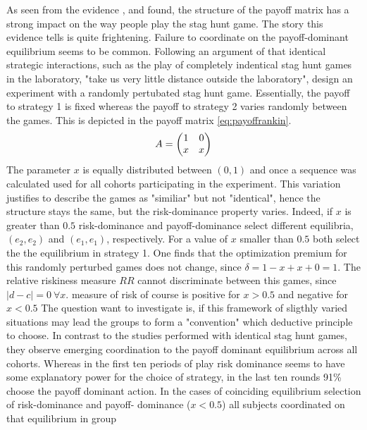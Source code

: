 \documentclass[11pt]{article}
\begin{document}
As seen from the evidence \textcite{battalio_optimization_2001},
\textcite{schmidt_playing_2003} and \textcite{dubois_optimization_2012} 
found, the structure of the payoff matrix has a strong impact on the way 
people play the stag hunt game.   
The story this evidence tells is quite frightening. Failure to coordinate 
on the payoff-dominant equilibrium seems to be common. Following an argument
of \textcite{kreps_game_1990} that identical strategic interactions, such
as the play of completely indentical stag hunt games in the laboratory,
"take us very little distance outside the laboratory", 
\textcite{rankin_strategic_2000} design an experiment with a randomly 
pertubated stag hunt game. Essentially, the payoff to strategy 1 is fixed 
whereas the payoff to strategy 2 varies randomly between the games. This is
depicted in the payoff matrix \eqref{eq:payoffrankin}.
\begin{align}
        \label{eq:payoffrankin}
        A = \mqty(1 & 0 \\ x & x)
\end{align}        
The parameter $x$ is equally distributed between $(0,1)$ and once a sequence
was calculated used for all cohorts participating in the experiment. This
variation justifies to describe the games as "similiar" but not
"identical", hence the structure stays the same, but the risk-dominance 
property varies. Indeed, if $x$ is greater than $0.5$ risk-dominance and
payoff-dominance select different equilibria, $(e_2,e_2)$ and $(e_1,e_1)$,
respectively. For a value of $x$ smaller than $0.5$ both select the 
the equilibrium in strategy 1. One finds that the optimization premium for 
this randomly perturbed games does not change, since $\delta=1-x+x+0=1$. 
The relative riskiness measure $RR$ cannot discriminate between this games,
since $|d-c|=0\ \forall x$. \cite{schmidt_playing_2003} measure of risk of 
course is positive for $x > 0.5$ and negative for $x <0.5$
The question \textcite{rankin_strategic_2000}
want to investigate is, if this framework of sligthly varied situations may
lead the groups to form a "convention" which deductive principle to choose. 
In contrast to the studies performed with identical stag hunt games, they 
observe emerging coordination to the payoff dominant equilibrium across
all cohorts. Whereas in the first ten periods of play risk dominance seems
to have some explanatory power for the choice of strategy, in the last ten
rounds 91\% choose the payoff dominant action. 
In the cases of coinciding equilibrium selection of risk-dominance and payoff-
dominance ($x < 0.5$) all subjects coordinated on that equilibrium in group
\end{document}
